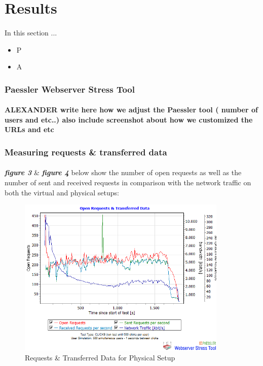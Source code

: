 \section{Results}
\paragraph{}
In this section ...

\begin{itemize}
    \item P
    \item A
\end{itemize}

\subsubsection{Paessler Webserver Stress Tool}
\paragraph{}

\textbf{ALEXANDER write here how we adjust the Paessler tool ( number of users and etc..) also include screenshot about how we customized the URLs and etc}

\subsubsection{Measuring requests \& transferred data}
\paragraph{}

\textbf{\textit{figure 3}} \& \textbf{\textit{figure 4}} below show the number of open requests as well as the number of sent and received requests in comparison with the network traffic on both the virtual and physical setups:
 
 \begin{figure}[H]
    \centering
    \includegraphics[width=10cm]{Pictures/graph6hw.png}
    \caption{Requests \& Transferred Data for Physical Setup}
    \label{fig:QQ3}
\end{figure}
   
